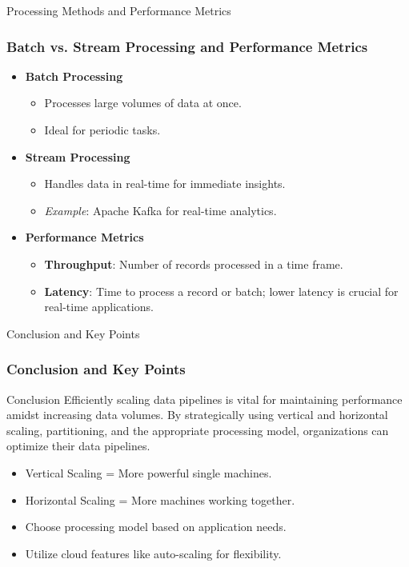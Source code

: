 \documentclass[aspectratio=169]{beamer}
\begin{document}
\begin{frame}[fragile]{Processing Methods and Performance Metrics}
    \frametitle{Batch vs. Stream Processing and Performance Metrics}
    \begin{itemize}
        \item \textbf{Batch Processing} 
        \begin{itemize}
            \item Processes large volumes of data at once.
            \item Ideal for periodic tasks.
        \end{itemize}
        
        \item \textbf{Stream Processing} 
        \begin{itemize}
            \item Handles data in real-time for immediate insights.
            \item \textit{Example}: Apache Kafka for real-time analytics.
        \end{itemize}

        \item \textbf{Performance Metrics}
        \begin{itemize}
            \item \textbf{Throughput}: Number of records processed in a time frame.
            \item \textbf{Latency}: Time to process a record or batch; lower latency is crucial for real-time applications.
        \end{itemize}
    \end{itemize}
\end{frame}

\begin{frame}[fragile]{Conclusion and Key Points}
    \frametitle{Conclusion and Key Points}
    \begin{block}{Conclusion}
        Efficiently scaling data pipelines is vital for maintaining performance amidst increasing data volumes. By strategically using vertical and horizontal scaling, partitioning, and the appropriate processing model, organizations can optimize their data pipelines.
    \end{block}

    \begin{itemize}
        \item Vertical Scaling = More powerful single machines.
        \item Horizontal Scaling = More machines working together.
        \item Choose processing model based on application needs.
        \item Utilize cloud features like auto-scaling for flexibility.
    \end{itemize}
\end{frame}
\end{document}
